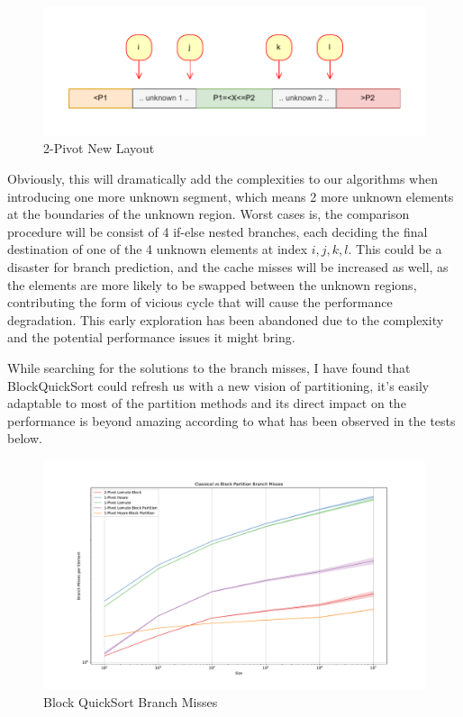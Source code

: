 \documentclass{article}
\begin{document}
\begin{figure}[H]
    \hypertarget{fig:2pivotnewlayout}{}
    \caption{2-Pivot New Layout}
    \centering
    \hspace*{-0.27\textwidth}
    \includegraphics[width=1.5\textwidth]{2pivot_new_layout.drawio.pdf}
\end{figure}

Obviously, this will dramatically add the complexities to our algorithms when introducing one more unknown segment, which means 2 more unknown elements at the boundaries of the unknown region. Worst cases is, the comparison procedure will be consist of 4 if-else nested branches, each deciding the final destination of one of the 4 unknown elements at index $i, j, k, l$.
This could be a disaster for branch prediction, and the cache misses will be increased as well, as the elements are more likely to be swapped between the unknown regions, contributing the form of vicious cycle that will cause the performance degradation. This early exploration has been abandoned due to the complexity and the potential performance issues it might bring.

While searching for the solutions to the branch misses, I have found that BlockQuickSort could refresh us with a new vision of partitioning, it's easily adaptable to most of the partition methods and its direct impact on the performance is beyond amazing
according to what has been observed in the tests below.

\begin{figure}[H]
    \hypertarget{fig:blockbranchmiss}{}
    \caption{Block QuickSort Branch Misses}
    \centering
    \hspace*{-0.27\textwidth}
    \includegraphics[width=1.5\textwidth]{Classical vs Block Partition Branch Misses.pdf}
\end{figure}
\end{document}
